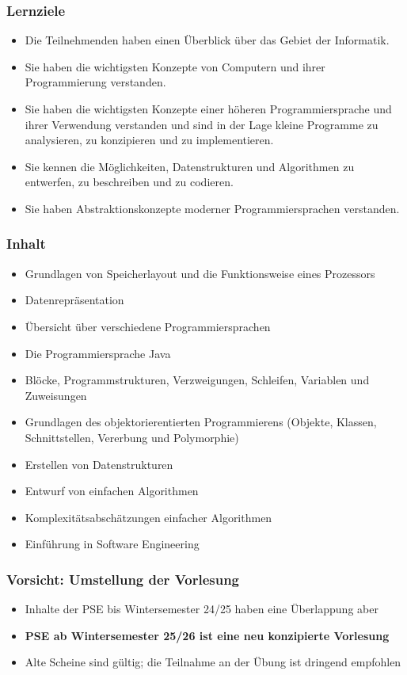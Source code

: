\documentclass{../../presentation}
\begin{document}
\begin{frame}[fragile]
  \frametitle{Lernziele}

  \begin{itemize}
    \item Die Teilnehmenden haben einen Überblick über das Gebiet der Informatik.
    \item Sie haben die wichtigsten Konzepte von Computern und ihrer Programmierung verstanden.
    \item Sie haben die wichtigsten Konzepte einer höheren Programmiersprache und ihrer Verwendung verstanden und sind in der Lage kleine Programme zu analysieren, zu konzipieren und zu implementieren.
    \item Sie kennen die Möglichkeiten, Datenstrukturen und Algorithmen zu entwerfen, zu beschreiben und zu codieren.
    \item Sie haben Abstraktionskonzepte moderner Programmiersprachen verstanden.
  \end{itemize}
\end{frame}


\begin{frame}[fragile]
  \frametitle{Inhalt}

  \begin{itemize}
    \item Grundlagen von Speicherlayout und die Funktionsweise eines Prozessors
    \item Datenrepräsentation
    \item Übersicht über verschiedene Programmiersprachen
    \item Die Programmiersprache Java
    \item Blöcke, Programmstrukturen, Verzweigungen, Schleifen, Variablen und Zuweisungen
    \item Grundlagen des objektorierentierten Programmierens (Objekte, Klassen, Schnittstellen, Vererbung und Polymorphie)
    \item Erstellen von Datenstrukturen
    \item Entwurf von einfachen Algorithmen
    \item Komplexitätsabschätzungen einfacher Algorithmen
    \item Einführung in Software Engineering
  \end{itemize}
\end{frame}


\begin{frame}[fragile]
  \frametitle{Vorsicht: Umstellung der Vorlesung}

  \begin{itemize}
    \item Inhalte der PSE bis Wintersemester 24/25 haben eine Überlappung aber
    \item \textbf{PSE ab Wintersemester 25/26 ist eine neu konzipierte Vorlesung}
    \item Alte Scheine sind gültig; die Teilnahme an der Übung ist dringend empfohlen
  \end{itemize}
\end{frame}
\end{document}
